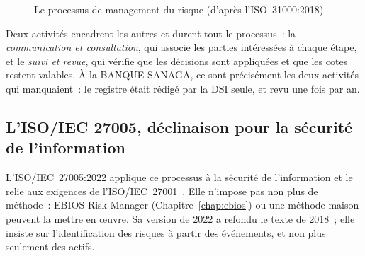 \begin{figure}[H]
\centering
{}
\caption{Le processus de management du risque (d'après l'ISO~31000:2018)}
\label{fig:c03-processus}
\end{figure}

Deux activités encadrent les autres et durent tout le processus~: la
\emph{communication et consultation}, qui associe les parties intéressées
à chaque étape, et le \emph{suivi et revue}, qui vérifie que les décisions
sont appliquées et que les cotes restent valables. À la BANQUE SANAGA, ce
sont précisément les deux activités qui manquaient~: le registre était
rédigé par la DSI seule, et revu une fois par an.

\subsection{L'ISO/IEC 27005, déclinaison pour la sécurité de l'information}

L'ISO/IEC~27005:2022 applique ce processus à la sécurité de l'information
et le relie aux exigences de l'ISO/IEC~27001~\cite{iso27005_2022}. Elle
n'impose pas non plus de méthode~: EBIOS Risk Manager
(Chapitre~\ref{chap:ebios}) ou une méthode maison peuvent la mettre en
œuvre. Sa version de 2022 a refondu le texte de 2018~; elle insiste sur
l'identification des risques à partir des événements, et non plus
seulement des actifs.

